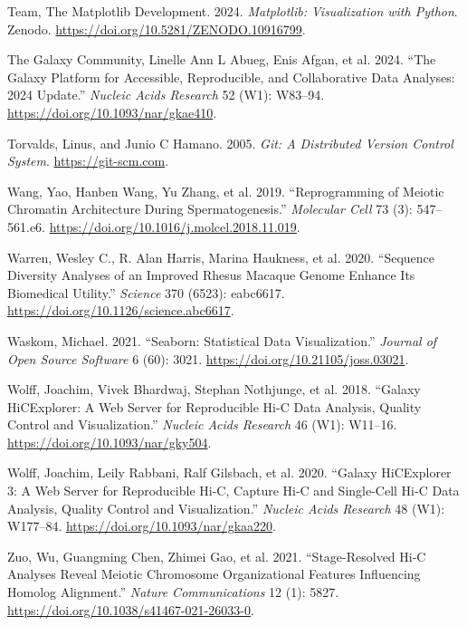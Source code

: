 \documentclass[
  11pt,
  a4paper,
]{scrbook}
\newlength{\cslhangindent}
\newenvironment{CSLReferences}[2] %
 {\begin{list}{}{%
  \setlength{\itemindent}{0pt}
  \setlength{\leftmargin}{0pt}
  \setlength{\parsep}{0pt}
  \ifodd #1
   \setlength{\leftmargin}{\cslhangindent}
   \setlength{\itemindent}{-1\cslhangindent}
  \fi
  \setlength{\itemsep}{#2\baselineskip}}}
 {\end{list}}
\begin{document}
\begin{CSLReferences}{1}{1}
Team, The Matplotlib Development. 2024. \emph{Matplotlib:
{Visualization} with {Python}}. Zenodo.
\url{https://doi.org/10.5281/ZENODO.10916799}.

The Galaxy Community, Linelle Ann L Abueg, Enis Afgan, et al. 2024.
{``The {Galaxy} Platform for Accessible, Reproducible, and Collaborative
Data Analyses: 2024 Update.''} \emph{Nucleic Acids Research} 52 (W1):
W83--94. \url{https://doi.org/10.1093/nar/gkae410}.

Torvalds, Linus, and Junio C Hamano. 2005. \emph{Git: A Distributed
Version Control System}. \url{https://git-scm.com}.

Wang, Yao, Hanben Wang, Yu Zhang, et al. 2019. {``Reprogramming of
{Meiotic Chromatin Architecture} During {Spermatogenesis}.''}
\emph{Molecular Cell} 73 (3): 547--561.e6.
\url{https://doi.org/10.1016/j.molcel.2018.11.019}.

Warren, Wesley C., R. Alan Harris, Marina Haukness, et al. 2020.
{``Sequence Diversity Analyses of an Improved Rhesus Macaque Genome
Enhance Its Biomedical Utility.''} \emph{Science} 370 (6523): eabc6617.
\url{https://doi.org/10.1126/science.abc6617}.

Waskom, Michael. 2021. {``Seaborn: Statistical Data Visualization.''}
\emph{Journal of Open Source Software} 6 (60): 3021.
\url{https://doi.org/10.21105/joss.03021}.

Wolff, Joachim, Vivek Bhardwaj, Stephan Nothjunge, et al. 2018.
{``Galaxy {HiCExplorer}: A Web Server for Reproducible {Hi-C} Data
Analysis, Quality Control and Visualization.''} \emph{Nucleic Acids
Research} 46 (W1): W11--16. \url{https://doi.org/10.1093/nar/gky504}.

Wolff, Joachim, Leily Rabbani, Ralf Gilsbach, et al. 2020. {``Galaxy
{HiCExplorer} 3: A Web Server for Reproducible {Hi-C}, Capture {Hi-C}
and Single-Cell {Hi-C} Data Analysis, Quality Control and
Visualization.''} \emph{Nucleic Acids Research} 48 (W1): W177--84.
\url{https://doi.org/10.1093/nar/gkaa220}.

Zuo, Wu, Guangming Chen, Zhimei Gao, et al. 2021. {``Stage-Resolved
{Hi-C} Analyses Reveal Meiotic Chromosome Organizational Features
Influencing Homolog Alignment.''} \emph{Nature Communications} 12 (1):
5827. \url{https://doi.org/10.1038/s41467-021-26033-0}.

\end{CSLReferences}
\end{document}
